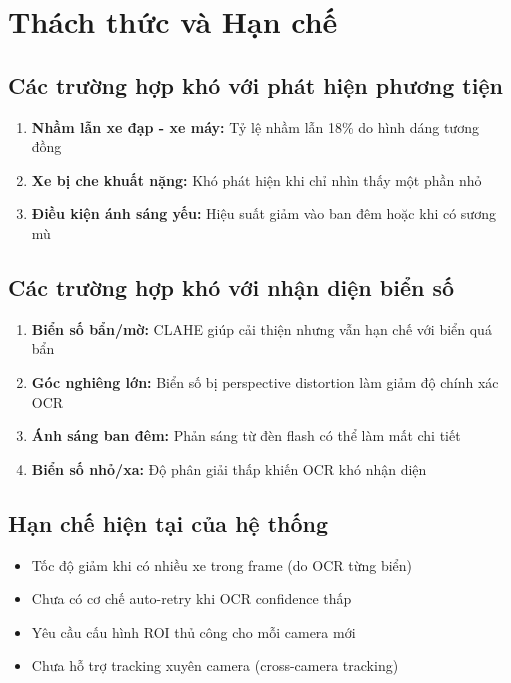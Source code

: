 \section{Thách thức và Hạn chế}

\subsection{Các trường hợp khó với phát hiện phương tiện}
\begin{enumerate}
    \item \textbf{Nhầm lẫn xe đạp - xe máy:} Tỷ lệ nhầm lẫn 18\% do hình dáng tương đồng
    \item \textbf{Xe bị che khuất nặng:} Khó phát hiện khi chỉ nhìn thấy một phần nhỏ
    \item \textbf{Điều kiện ánh sáng yếu:} Hiệu suất giảm vào ban đêm hoặc khi có sương mù
\end{enumerate}

\subsection{Các trường hợp khó với nhận diện biển số}
\begin{enumerate}
    \item \textbf{Biển số bẩn/mờ:} CLAHE giúp cải thiện nhưng vẫn hạn chế với biển quá bẩn
    \item \textbf{Góc nghiêng lớn:} Biển số bị perspective distortion làm giảm độ chính xác OCR
    \item \textbf{Ánh sáng ban đêm:} Phản sáng từ đèn flash có thể làm mất chi tiết
    \item \textbf{Biển số nhỏ/xa:} Độ phân giải thấp khiến OCR khó nhận diện
\end{enumerate}

\subsection{Hạn chế hiện tại của hệ thống}
\begin{itemize}
    \item Tốc độ giảm khi có nhiều xe trong frame (do OCR từng biển)
    \item Chưa có cơ chế auto-retry khi OCR confidence thấp
    \item Yêu cầu cấu hình ROI thủ công cho mỗi camera mới
    \item Chưa hỗ trợ tracking xuyên camera (cross-camera tracking)
\end{itemize}

